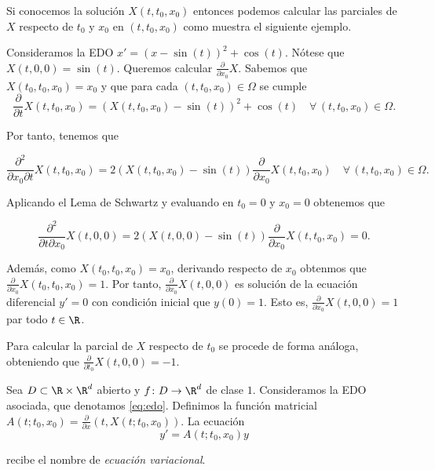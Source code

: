 Si conocemos la solución $X(t, t_0, x_0)$ entonces podemos calcular las parciales de $X$ respecto de
$t_0$ y $x_0$ en $(t,t_0, x_0)$ como muestra el siguiente ejemplo.

\begin{ex}
  Consideramos la EDO $x' = (x - \sin(t))^2 + \cos(t)$. Nótese que $X(t, 0, 0) = \sin(t)$. Queremos
  calcular $\frac{\partial}{\partial x_0} X$.  Sabemos que $X(t_0, t_0, x_0) = x_0$ y que para cada
  $(t, t_0, x_0) \in \Omega$ se cumple
  \[ \frac{\partial}{\partial t} X(t, t_0, x_0) = (X(t, t_0, x_0) - \sin(t))^2 + \cos(t) \quad
    \forall \, (t, t_0, x_0) \in \Omega. \]

  Por tanto, tenemos que

  \[ \frac{\partial^2}{\partial x_0\partial t} X(t, t_0, x_0) = 2(X(t, t_0, x_0) -
    \sin(t))\frac{\partial}{\partial x_0} X(t, t_0, x_0) \quad \forall \, (t, t_0, x_0) \in
    \Omega. \]

  Aplicando el Lema de Schwartz y evaluando en $t_0 = 0$ y $x_0 = 0$ obtenemos que

  \[ \frac{\partial^2}{\partial t\partial x_0} X(t, 0, 0) = 2(X(t, 0, 0) -
    \sin(t))\frac{\partial}{\partial x_0} X(t, t_0, x_0) = 0. \]

  Además, como $X(t_0,t_0, x_0) = x_0$, derivando respecto de $x_0$ obtenmos que
  $\frac{\partial}{\partial x_0} X(t_0, t_0, x_0) = 1$. Por tanto,
  $\frac{\partial}{\partial x_0}X(t, 0,0)$ es solución de la ecuación diferencial $y' = 0$ con
  condición inicial que $y(0) = 1$. Esto es, $\frac{\partial}{\partial x_0}X(t, 0,0) = 1$ par todo
  $t \in \R$.

  Para calcular la parcial de $X$ respecto de $t_0$ se procede de forma análoga, obteniendo que
  $\frac{\partial}{\partial t_0} X(t, 0,0) = -1$.
\end{ex}

\begin{definition}
  Sea $D \subset \R \times \R^d$ abierto y $f \colon D \to \R^d$ de clase $1$. Consideramos la EDO
  asociada, que denotamos \eqref{eq:edo}. Definimos la función matricial
  $A(t;t_0, x_0) = \frac{\partial}{\partial x} (t, X(t;t_0,x_0))$. La ecuación
  \begin{equation}
    \label{eq:variacional}
    y' = A(t; t_0, x_0) y
  \end{equation}

  recibe el nombre de \emph{ecuación variacional}.
\end{definition}

